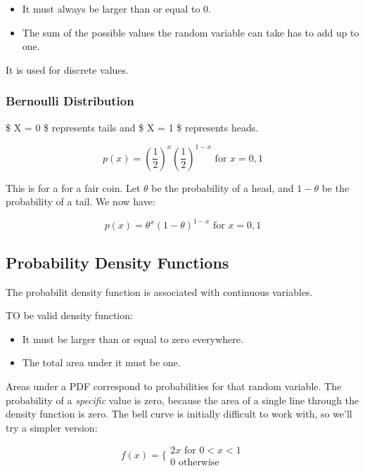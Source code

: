 \documentclass[]{article}
\providecommand{\tightlist}{%
  \setlength{\itemsep}{0pt}\setlength{\parskip}{0pt}}
\begin{document}
\begin{itemize}
\tightlist
\item
  It must always be larger than or equal to 0.
\item
  The sum of the possible values the random variable can take has to add
  up to one.
\end{itemize}

It is used for discrete values.

\hypertarget{bernoulli-distribution}{%
\subsubsection{Bernoulli Distribution}\label{bernoulli-distribution}}

\$ X = 0 \$ represents tails and \$ X = 1 \$ represents heads.

\[ p(x) = (\frac{1}{2})^x(\frac{1}{2})^{1-x} \text{ for } x=0,1 \]

This is for a for a fair coin. Let \(\theta\) be the probability of a
head, and \(1-\theta\) be the probability of a tail. We now have:

\[ p(x) = \theta^x (1-\theta)^{1-x} \text{ for } x=0,1 \]

\hypertarget{probability-density-functions}{%
\subsection{Probability Density
Functions}\label{probability-density-functions}}

The probabilit density function is associated with continuous variables.

TO be valid density function:

\begin{itemize}
\tightlist
\item
  It must be larger than or equal to zero everywhere.
\item
  The total area under it must be one.
\end{itemize}

Areas under a PDF correspond to probabilities for that random variable.
The probability of a \emph{specific} value is zero, because the area of
a single line through the density function is zero. The bell curve is
initially difficult to work with, so we'll try a simpler version:

\[ 
f(x) = 
\Bigg\{
\begin{array}{ll}
    2x \text{ for } 0 < x < 1\\
    0 \text{ otherwise}
\end{array}
\]
\end{document}
